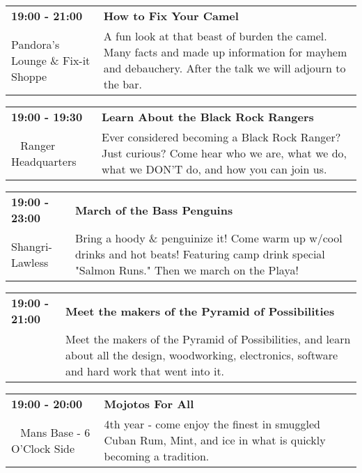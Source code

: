 \begin{tabular}{ p{1in} p{2.2in} }
    \textbf{19:00 - 21:00} & \textbf{How to Fix Your Camel} \\
    Pandora's Lounge \& Fix-it Shoppe \newline  & A fun look at that beast of burden the camel. Many facts and made up information for mayhem and debauchery. After the talk we will adjourn to the bar. \\
    \hline 
\end{tabular}
    
\begin{tabular}{ p{1in} p{2.2in} }
    \textbf{19:00 - 19:30} & \textbf{Learn About the Black Rock Rangers} \\
    ~ \newline Ranger Headquarters & Ever considered becoming a Black Rock Ranger? Just curious? Come hear who we are, what we do, what we DON'T do, and how you can join us. \\
    \hline 
\end{tabular}
    
\begin{tabular}{ p{1in} p{2.2in} }
    \textbf{19:00 - 23:00} & \textbf{March of the Bass Penguins} \\
    Shangri-Lawless \newline  & Bring a hoody \& penguinize it! Come warm up w/cool drinks and hot beats! Featuring camp drink special "Salmon Runs." Then we march on the Playa! \\
    \hline 
\end{tabular}
    
\begin{tabular}{ p{1in} p{2.2in} }
    \textbf{19:00 - 21:00} & \textbf{Meet the makers of the Pyramid of Possibilities} \\
    ~ \newline  & Meet the makers of the Pyramid of Possibilities, and learn about all the design, woodworking, electronics, software and hard work that went into it. \\
    \hline 
\end{tabular}
    
\begin{tabular}{ p{1in} p{2.2in} }
    \textbf{19:00 - 20:00} & \textbf{Mojotos For All} \\
    ~ \newline Mans Base - 6 O'Clock Side & 4th year - come enjoy the finest in smuggled Cuban Rum, Mint, and ice in what is quickly becoming a tradition. \\
    \hline 
\end{tabular}
    

